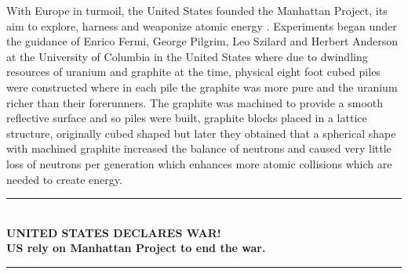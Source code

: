 \documentclass[11pt]{article}
\begin{document}
\begin{multicols}{2}
\noindent With Europe in turmoil, the United States founded the Manhattan Project, its aim to explore, harness and weaponize atomic energy \cite{TMP}.
Experiments began under the guidance of Enrico Fermi, George Pilgrim, Leo Szilard and Herbert Anderson at the University of Columbia \cite{Fermi} in the United States where due to dwindling resources of uranium and graphite at the time, physical eight foot cubed piles were constructed where in each pile the graphite was more pure and the uranium richer than their forerunners. The graphite was machined to provide a smooth reflective surface and so piles were built, graphite blocks placed in a lattice structure, originally cubed shaped but later they obtained that a spherical shape with machined graphite increased the balance of neutrons and caused very little loss of neutrons per generation which enhances more atomic collisions which are needed to create energy.\\ [-0.8cm]

\begin{center}
    \rule{9cm}{0.05cm} \\ [0.3cm]
    \textbf{\Huge{UNITED STATES DECLARES WAR!}} \\
    \textbf{US rely on Manhattan Project to end the war.} \\ 
    \rule{9cm}{0.1cm}\\ [-0.1cm]
\end{center} 
\vspace{-0.1cm}


\end{multicols}
\end{document}
